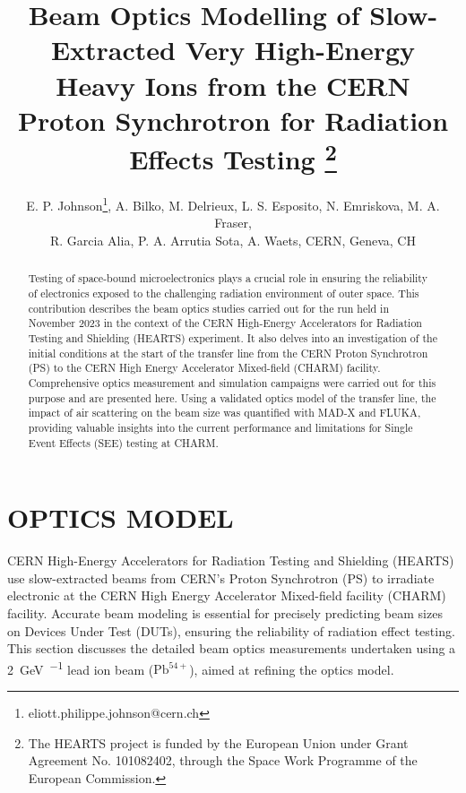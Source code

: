 \documentclass[a4paper,
               biblatex,     %
               ]{jacow}
\begin{document}
\title{Beam Optics Modelling of Slow-Extracted Very High-Energy Heavy Ions from the CERN Proton Synchrotron for Radiation Effects Testing \thanks{The HEARTS project is funded by the European Union under Grant Agreement No. 101082402, through the Space Work Programme of the European Commission.}}

\author{E. P. Johnson\thanks{eliott.philippe.johnson@cern.ch},
    A. Bilko, 
    M. Delrieux, 
    L. S. Esposito, 
    N. Emriskova, 
    M. A. Fraser,\\ 
    R. Garcia Alia,
    P. A. Arrutia Sota, 
    A. Waets, CERN, Geneva, CH}
	
\maketitle

%
\begin{abstract}
   Testing of space-bound microelectronics plays a crucial role in ensuring the reliability of electronics exposed to the challenging radiation environment of outer space. This contribution describes the beam optics studies carried out for the run held in November 2023 in the context of the CERN High-Energy Accelerators for Radiation Testing and Shielding (HEARTS) experiment. It also delves into an investigation of the initial conditions at the start of the transfer line from the CERN Proton Synchrotron (PS) to the CERN High Energy Accelerator Mixed-field (CHARM) facility. Comprehensive optics measurement and simulation campaigns were carried out for this purpose and are presented here. Using a validated optics model of the transfer line, the impact of air scattering on the beam size was quantified with MAD-X and FLUKA, providing valuable insights into the current performance and limitations for Single Event Effects (SEE) testing at CHARM.
\end{abstract}







\section{OPTICS MODEL}

CERN High-Energy Accelerators for Radiation Testing and Shielding (HEARTS) \cite{noauthor_hearts_nodate} use slow-extracted beams from CERN's Proton Synchrotron (PS) to irradiate electronic at the CERN High Energy Accelerator Mixed-field facility (CHARM) facility. Accurate beam modeling is essential for precisely predicting beam sizes on Devices Under Test (DUTs), ensuring the reliability of radiation effect testing. This section discusses the detailed beam optics measurements undertaken using a \SI{2}{\giga\electronvolt\per\nucleon} lead ion beam (\( \text{Pb}^{54+} \)), aimed at refining the optics model. 
\end{document}
